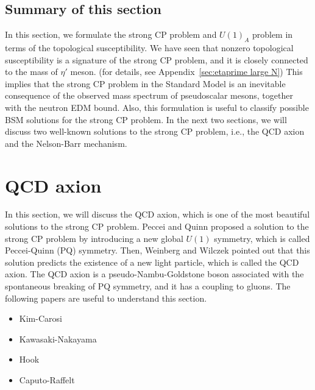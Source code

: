 \documentclass[11pt,a4paper]{article}
\begin{document}
\subsection{Summary of this section}
In this section, we formulate the strong CP problem and $U(1)_A$ problem in terms of the topological susceptibility. We have seen that nonzero topological susceptibility is a signature of the strong CP problem, and it is closely connected to the mass of $\eta'$ meson. (for details, see Appendix~\ref{sec:etaprime large N}) 
This implies that the strong CP problem in the Standard Model is an inevitable consequence of the observed mass spectrum of pseudoscalar mesons, together with the neutron EDM bound.
Also, this formulation is useful to classify possible BSM solutions for the strong CP problem.
In the next two sections, we will discuss two well-known solutions to the strong CP problem, i.e., the QCD axion and the Nelson-Barr mechanism.


\section{QCD axion}\label{sec:qcd axion}
In this section, we will discuss the QCD axion, which is one of the most beautiful solutions to the strong CP problem. Peccei and Quinn \cite{Peccei:1977hh, Peccei:1977ur} proposed a solution to the strong CP problem by introducing a new global $U(1)$ symmetry, which is called Peccei-Quinn (PQ) symmetry. Then, Weinberg \cite{Weinberg:1977ma} and Wilczek \cite{Wilczek:1977pj} pointed out that this solution predicts the existence of a new light particle, which is called the QCD axion. The QCD axion is a pseudo-Nambu-Goldstone boson associated with the spontaneous breaking of PQ symmetry, and it has a coupling to gluons.
The following papers are useful to understand this section.
\begin{itemize}
\item Kim-Carosi \cite{Kim:2008hd}
\item Kawasaki-Nakayama \cite{Kawasaki:2013ae}
\item Hook \cite{Hook:2018dlk}
\item Caputo-Raffelt \cite{Caputo:2024oqc}
\end{itemize}
\end{document}
